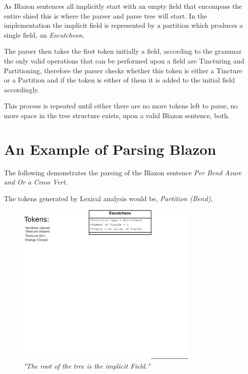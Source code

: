 As Blazon sentences all implicitly start with an empty field that encompass the entire shied this is where the parser and parse tree will start.  In the implementation the implicit field is represented by a partition which produces a single field,  an \emph{Escutcheon}. 

The parser then takes the first token initially a field, according to the grammar the only valid operations that can be performed upon a field are Tincturing and Partitioning, therefore the parser checks whether this token is either a Tincture or a Partition and if the token is either of them it is added to the initial field accordingly.  

This process is repeated until either there are no more tokens left to parse, no more space in the tree structure exists, upon a valid Blazon sentence, both. 



\section{An Example of Parsing Blazon}


The following demonstrates the parsing of the Blazon sentence \emph{Per Bend Azure and Or a Cross Vert}.  

The tokens generated by Lexical analysis would be, \emph{Partition (Bend), }


\begin{figure}[H]
  \centering
    \includegraphics[width=0.8\textwidth]{parsing/images/Parsing5.eps}
  \caption{\emph{"The root of the tree is the implicit Field."}}
  
\end{figure}


